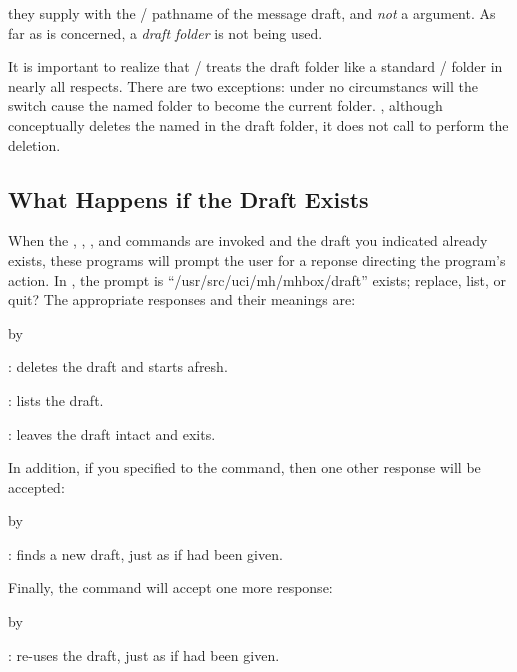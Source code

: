 they supply  with the \unix/ pathname of the message draft,
and {\it not} a  argument.
As far as  is concerned,
a {\it draft folder} is not being used.
\par
It is important to realize that \MH/ treats the draft folder like a standard
\MH/ folder in nearly all respects.
There are two exceptions:
under no circumstancs will the  switch cause the
named folder to become the current folder.%
,
although conceptually  deletes the  named in the draft
folder,
it does not call  to perform the deletion.
\subsection{What Happens if the Draft Exists}
When the , , , and  commands are
invoked and the draft you indicated already exists,
these programs will prompt the user for a reponse directing the program's
action.
In , the prompt is
\begingroup
    \smallertype
    \example
	``/usr/src/uci/mh/mhbox/draft'' exists; replace, list, or quit?%
    \endexample
\endgroup
The appropriate responses and their meanings are:
\smallskip
{\advance\leftskip by\parindent
\item{:} deletes the draft and starts afresh.
\item{:} lists the draft.
\item{:} leaves the draft intact and exits.
\smallskip}
\noindent
In addition, if you specified  to the command,
then one other response will be accepted:
\smallskip
{\advance\leftskip by\parindent
\item{:} finds a new draft,
just as if  had been given.
\smallskip}
\noindent
Finally, the  command will accept one more response:
\smallskip
{\advance\leftskip by\parindent
\item{:} re-uses the draft,
just as if  had been given.
\smallskip}
